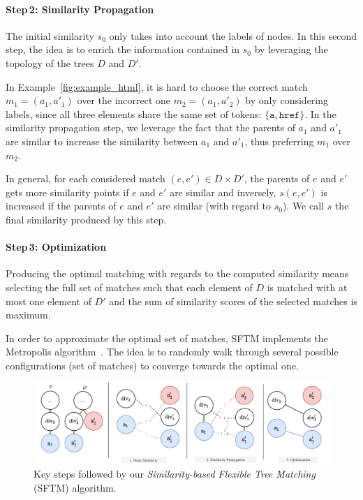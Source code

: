 \paragraph{Step\,2: Similarity Propagation}
The initial similarity $s_0$ only takes into account the labels of nodes.
In this second step, the idea is to enrich the information contained in $s_0$ by leveraging the topology of the trees $D$ and $D'$.
\begin{ex}
    In Example~\ref{fig:example_html}, it is hard to choose the correct match $m_1 = (a_1, a'_1)$ over the incorrect one $m_2 = (a_1, a'_2)$ by only considering labels, since all three elements share the same set of tokens: $\{\texttt{a}, \texttt{href}\}$.
    In the similarity propagation step, we leverage the fact that the parents of $a_1$ and $a'_1$ are similar to increase the similarity between $a_1$ and $a'_1$, thus preferring $m_1$ over $m_2$.
\end{ex}
In general, for each considered match $(e, e') \in D \times D'$, the parents of $e$ and $e'$ gets more similarity points if $e$ and $e'$ are similar and inversely, $s(e, e')$ is increased if the parents of $e$ and $e'$ are similar (with regard to $s_0$).
We call $s$ the final similarity produced by this step.

\paragraph{Step\,3: Optimization}
Producing the optimal matching with regards to the computed similarity means selecting the full set of matches such that each element of $D$ is matched with at most one element of $D'$ and the sum of similarity scores of the selected matches is maximum.

In order to approximate the optimal set of matches, SFTM implements the Metropolis algorithm~\cite{metropolis1953equation}.
The idea is to randomly walk through several possible configurations (set of matches) to converge towards the optimal one.

\begin{figure}[!t]
    \centering
    \includegraphics[width=\linewidth]{erratum/explanations/sftm}
    \caption{Key steps followed by our \emph{Similarity-based Flexible Tree Matching} (SFTM) algorithm.}
    \label{fig:steps_sftm}
\end{figure}

